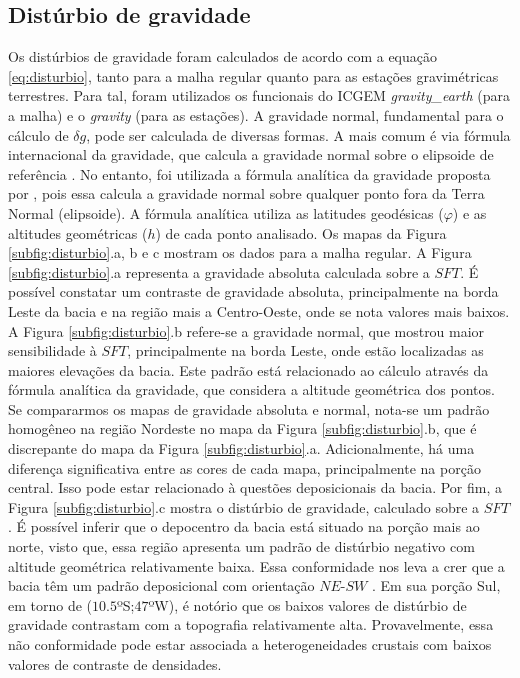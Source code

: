\subsection{Distúrbio de gravidade}
\label{subsec:delta}
Os distúrbios de gravidade foram calculados de acordo com a equação \ref{eq:disturbio}, tanto para a malha regular quanto para as estações gravimétricas terrestres. Para tal, foram utilizados os funcionais do ICGEM \textit{gravity\_earth} (para a malha) e o \textit{gravity} (para as estações). A gravidade normal, fundamental para o cálculo de $\delta g$, pode ser calculada de diversas formas. A mais comum é via fórmula internacional da gravidade, que calcula a gravidade normal sobre o elipsoide de referência \cite{somigliana}. No entanto, foi utilizada a fórmula analítica da gravidade proposta por , pois essa calcula a gravidade normal sobre qualquer ponto fora da Terra Normal (elipsoide). A fórmula analítica utiliza as latitudes geodésicas ($\varphi$) e as altitudes geométricas ($h$) de cada ponto analisado. Os mapas da Figura \ref{subfig:disturbio}.a, b e c mostram os dados para a malha regular. A Figura \ref{subfig:disturbio}.a representa a gravidade absoluta calculada sobre a $SFT$. É possível constatar um contraste de gravidade absoluta, principalmente na borda Leste da bacia e na região mais a Centro-Oeste, onde se nota valores mais baixos.  A Figura \ref{subfig:disturbio}.b refere-se a gravidade normal, que mostrou maior sensibilidade à $SFT$, principalmente na borda Leste, onde estão localizadas as maiores elevações da bacia. Este padrão está relacionado ao cálculo através da fórmula analítica da gravidade, que considera a altitude geométrica dos pontos. Se compararmos os mapas de gravidade absoluta e normal, nota-se um padrão homogêneo na região Nordeste no mapa da Figura \ref{subfig:disturbio}.b, que é discrepante do mapa da Figura \ref{subfig:disturbio}.a. Adicionalmente, há uma diferença significativa entre as cores de cada mapa, principalmente na porção central. Isso pode estar relacionado à questões deposicionais da bacia. Por fim, a Figura \ref{subfig:disturbio}.c mostra o distúrbio de gravidade, calculado sobre a $SFT$. É possível inferir que o depocentro da bacia está situado na porção mais ao norte, visto que, essa região apresenta um padrão de distúrbio negativo com altitude geométrica relativamente baixa. Essa conformidade nos leva a crer que a bacia têm um padrão deposicional com orientação $NE$-$SW$ \cite{tese_bacia_parnaiba}. Em sua porção Sul, em torno de ($10.5$ºS;$47$ºW), é notório que os baixos valores de distúrbio de gravidade contrastam com a topografia relativamente alta. Provavelmente, essa não conformidade pode estar associada a heterogeneidades crustais com baixos valores de contraste de densidades.

